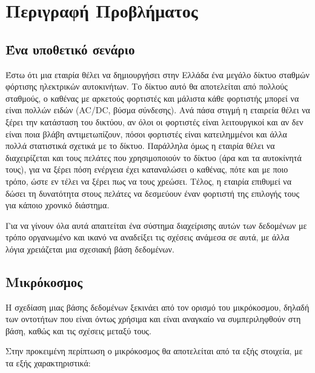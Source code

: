 \documentclass[manuscript,screen,review]{acmart}
\newcommand{\en}[1]{\foreignlanguage{english}{#1}}
\begin{document}
\newpage

\section{Περιγραφή Προβλήματος}

\subsection{Ένα υποθετικό σενάριο}


Έστω ότι μια εταιρία θέλει να δημιουργήσει στην Ελλάδα ένα μεγάλο δίκτυο σταθμών φόρτισης
ηλεκτρικών αυτοκινήτων. Το δίκτυο αυτό θα αποτελείται από πολλούς σταθμούς, ο καθένας
με αρκετούς φορτιστές και μάλιστα κάθε φορτιστής μπορεί να είναι πολλών ειδών \en{ (AC/DC,}
βύσμα σύνδεσης). Ανά πάσα στιγμή η εταιρεία θέλει να ξέρει την κατάσταση του δικτύου, αν
όλοι οι φορτιστές είναι λειτουργικοί και αν δεν είναι ποια βλάβη αντιμετωπίζουν, πόσοι
φορτιστές είναι κατειλημμένοι και άλλα πολλά στατιστικά σχετικά με το δίκτυο. Παράλληλα
όμως η εταιρία θέλει να διαχειρίζεται και τους πελάτες που χρησιμοποιούν το δίκτυο (άρα
και τα αυτοκίνητά τους), για να ξέρει πόση ενέργεια έχει καταναλώσει ο καθένας, πότε και
με ποιο τρόπο, ώστε εν τέλει να ξέρει πως να τους χρεώσει. Τέλος, η εταιρία επιθυμεί να
δώσει τη δυνατότητα στους πελάτες να δεσμεύουν έναν φορτιστή της επιλογής τους για κάποιο
χρονικό διάστημα.

Για να γίνουν όλα αυτά απαιτείται ένα σύστημα διαχείρισης αυτών των δεδομένων με τρόπο
οργανωμένο και ικανό να αναδείξει τις σχέσεις ανάμεσα σε αυτά, με άλλα λόγια χρειάζεται
μια σχεσιακή βάση δεδομένων.

\subsection{Μικρόκοσμος}

Η σχεδίαση μιας βάσης δεδομένων ξεκινάει από τον ορισμό του μικρόκοσμου, δηλαδή των
οντοτήτων που είναι όντως χρήσιμα και είναι αναγκαίο να συμπεριληφθούν στη βάση, καθώς
και τις σχέσεις μεταξύ τους.

Στην προκειμένη περίπτωση ο μικρόκοσμος θα αποτελείται από τα εξής στοιχεία, με τα εξής
χαρακτηριστικά:
\end{document}
